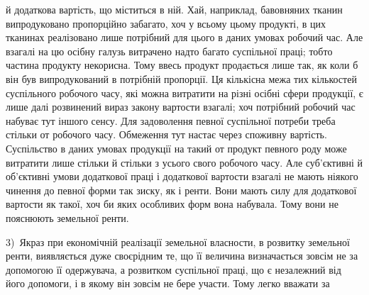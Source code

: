 й додаткова вартість, що міститься в ній. Хай, наприклад, бавовняних тканин
випродуковано пропорційно забагато, хоч у всьому цьому продукті, в цих тканинах
реалізовано лише потрібний для цього в даних умовах робочий час. Але взагалі
на цю осібну галузь витрачено надто багато суспільної праці; тобто частина
продукту некорисна. Тому ввесь продукт продається лише так, як коли б він
був випродукований в потрібній пропорції. Ця кількісна межа тих кількостей
суспільного робочого часу, які можна витратити на різні осібні сфери продукції,
є лише далі розвинений вираз закону вартости взагалі; хоч потрібний робочий
час набуває тут іншого сенсу. Для задоволення певної суспільної потреби треба
стільки от робочого часу. Обмеження тут настає через споживну вартість. Суспільство
в даних умовах продукції на такий от продукт певного роду може
витратити лише стільки й стільки з усього свого робочого часу. Але суб’єктивні
й об'єктивні умови додаткової праці і додаткової вартости взагалі не мають
ніякого чинення до певної форми так зиску, як і ренти. Вони мають силу для
додаткової вартости як такої, хоч би яких особливих форм вона набувала. Тому
вони не пояснюють земельної ренти.

3)~Якраз при економічній реалізації земельної власности, в розвитку земельної
ренти, виявляється дуже своєрідним те, що її величина визначається
зовсім не за допомогою її одержувача, а розвитком суспільної праці, що є незалежний
від його допомоги, і в якому він зовсім не бере участи. Тому легко вважати за
\parbreak{}  %
